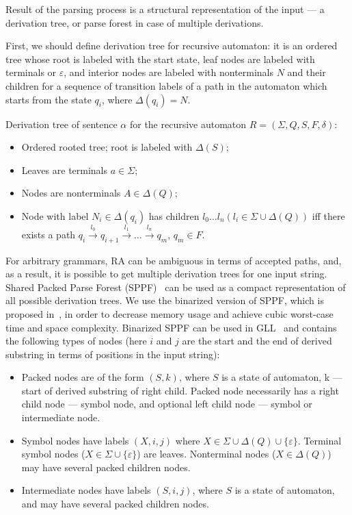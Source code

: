 \documentclass[runningheads,a4paper]{llncs}
\begin{document}
Result of the parsing process is a structural representation of the input --- a derivation tree, or parse forest in case of multiple derivations.

First, we should define derivation tree for recursive automaton: it is an ordered tree whose root is labeled with the start state,
leaf nodes are labeled with terminals or $\varepsilon$, and interior nodes are labeled with  nonterminals $N$ and their children for a sequence of transition labels of a path in the
automaton which starts from the state $q_i$, where $ \Delta(q_i) = N $.

\begin{mydef}

Derivation tree of sentence $\alpha$ for the recursive automaton $R=(\Sigma, Q, S, F, \delta)$:%

\begin{itemize}
\item Ordered rooted tree; root is labeled with $\Delta(S)$;
\item Leaves are terminals $a\in \Sigma$;
\item Nodes are nonterminals $A\in \Delta(Q)$;
\item Node with label $N_i \in \Delta(q_i)$ has children $l_0 \dots l_n (l_i \in \Sigma \cup \Delta(Q))$ iff there exists a
path $q_i \xrightarrow[]{l_0} q_{i+1} \xrightarrow[]{l_1} \dots \xrightarrow{l_n} q_m$, $q_m \in F$. 
\end{itemize}

\end{mydef}

For arbitrary grammars, RA can be ambiguous in terms of accepted paths, and, as a result, it is possible to get multiple derivation trees for one input string.
Shared Packed Parse Forest (SPPF)~\cite{SPPF} can be used as a compact representation of all possible derivation trees.
We use the binarized version of SPPF, which is proposed in~\cite{brnglr}, in order to decrease memory usage and achieve cubic worst-case time and space complexity.
Binarized SPPF can be used in GLL~\cite{scott2013gll} and contains the following types of nodes (here $i$ and $j$ are the start and the end of derived substring in terms of positions in the input string):

\begin{itemize}
\item Packed nodes are of the form $(S, k)$, where $S$ is a state of automaton, k --- start of derived substring of right child.
Packed node necessarily has a right child node --- symbol node, and optional left child node --- symbol or intermediate node.
\item Symbol nodes have labels $(X, i, j)$ where $X \in \Sigma \cup \Delta(Q) \cup \{\varepsilon\}$.
Terminal symbol nodes ($X \in \Sigma \cup \{\varepsilon\}$) are leaves. 
Nonterminal nodes ($X \in \Delta(Q)$) may have several packed children nodes. 
\item Intermediate nodes have labels $ (S, i, j) $, where $S$ is a state of automaton, and may have several packed children nodes. 
\end{itemize}
\end{document}
